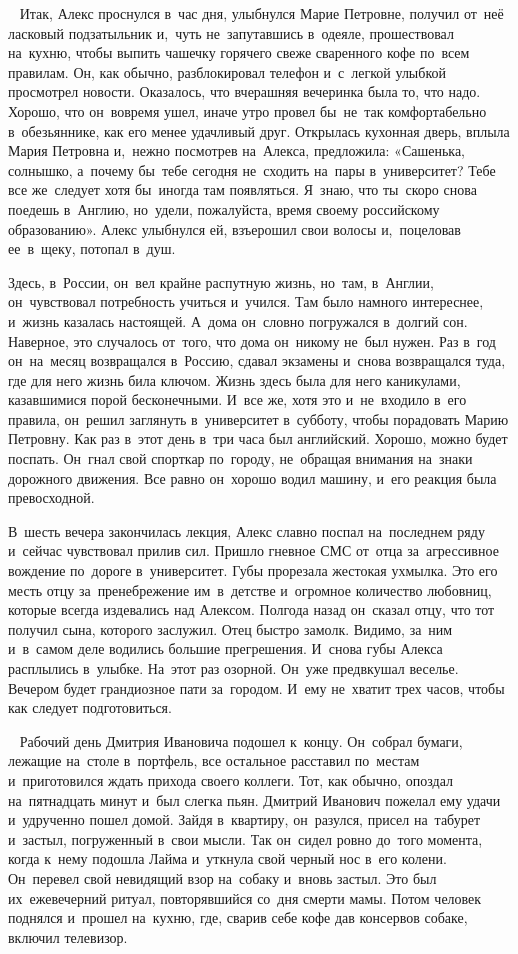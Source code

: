 ~
Итак, Алекс проснулся в~час дня, улыбнулся Марие Петровне, получил от~неё ласковый подзатыльник и,~чуть не~запутавшись в~одеяле, прошествовал на~кухню, чтобы выпить чашечку горячего свеже сваренного кофе по~всем правилам.
Он, как обычно, разблокировал телефон и~с~легкой улыбкой просмотрел новости.
Оказалось, что вчерашняя вечеринка была то, что надо.
Хорошо, что он~вовремя ушел, иначе утро провел бы~не~так комфортабельно в~обезьяннике, как его менее удачливый друг.
Открылась кухонная дверь, вплыла Мария Петровна и,~нежно посмотрев на~Алекса, предложила: «Сашенька, солнышко, а~почему бы~тебе сегодня не~сходить на~пары в~университет? Тебе все же~следует хотя бы~иногда там появляться.
Я~знаю, что ты~скоро снова поедешь в~Англию, но~удели, пожалуйста, время своему российскому образованию».
Алекс улыбнулся ей, взъерошил свои волосы и,~поцеловав ее~в~щеку, потопал в~душ.
 
Здесь, в~России, он~вел крайне распутную жизнь, но~там, в~Англии, он~чувствовал потребность учиться и~учился.
Там было намного интереснее, и~жизнь казалась настоящей.
А~дома он~словно погружался в~долгий сон.
Наверное, это случалось от~того, что дома он~никому не~был нужен.
Раз в~год он~на~месяц возвращался в~Россию, сдавал экзамены и~снова возвращался туда, где для него жизнь била ключом.
Жизнь здесь была для него каникулами, казавшимися порой бесконечными.
И~все же, хотя это и~не~входило в~его правила, он~решил заглянуть в~университет в~субботу, чтобы порадовать Марию Петровну.
Как раз в~этот день в~три часа был английский.
Хорошо, можно будет поспать.
Он~гнал свой спорткар по~городу, не~обращая внимания на~знаки дорожного движения.
Все равно он~хорошо водил машину, и~его реакция была превосходной.
 
В~шесть вечера закончилась лекция, Алекс славно поспал на~последнем ряду и~сейчас чувствовал прилив сил.
Пришло гневное СМС от~отца за~агрессивное вождение по~дороге в~университет.
Губы прорезала жестокая ухмылка.
Это его месть отцу за~пренебрежение им~в~детстве и~огромное количество любовниц, которые всегда издевались над Алексом.
Полгода назад он~сказал отцу, что тот получил сына, которого заслужил.
Отец быстро замолк.
Видимо, за~ним и~в~самом деле водились большие прегрешения.
И~снова губы Алекса расплылись в~улыбке.
На~этот раз озорной.
Он~уже предвкушал веселье.
Вечером будет грандиозное пати за~городом.
И~ему не~хватит трех часов, чтобы как следует подготовиться.

~
Рабочий день Дмитрия Ивановича подошел к~концу.
Он~собрал бумаги, лежащие на~столе в~портфель, все остальное расставил по~местам и~приготовился ждать прихода своего коллеги.
Тот, как обычно, опоздал на~пятнадцать минут и~был слегка пьян.
Дмитрий Иванович пожелал ему удачи и~удрученно пошел домой.
Зайдя в~квартиру, он~разулся, присел на~табурет и~застыл, погруженный в~свои мысли.
Так он~сидел ровно до~того момента, когда к~нему подошла Лайма и~уткнула свой черный нос в~его колени.
Он~перевел свой невидящий взор на~собаку и~вновь застыл.
Это был их~ежевечерний ритуал, повторявшийся со~дня смерти мамы.
Потом человек поднялся и~прошел на~кухню, где, сварив себе кофе дав консервов собаке, включил телевизор.
 

